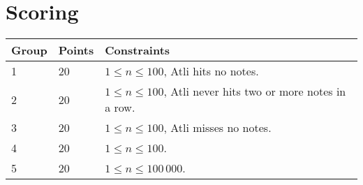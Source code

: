 \section*{Scoring}
\begin{tabular}{|l|l|l|}
\hline
Group & Points & Constraints \\ \hline
1     & 20   & $1 \leq n \leq 100$, Atli hits no notes. \\ \hline
2     & 20   & $1 \leq n \leq 100$, Atli never hits two or more notes in a row. \\ \hline
3     & 20   & $1 \leq n \leq 100$, Atli misses no notes. \\ \hline
4     & 20   & $1 \leq n \leq 100$. \\ \hline
5     & 20   & $1 \leq n \leq 100\,000$. \\ \hline
\end{tabular}
